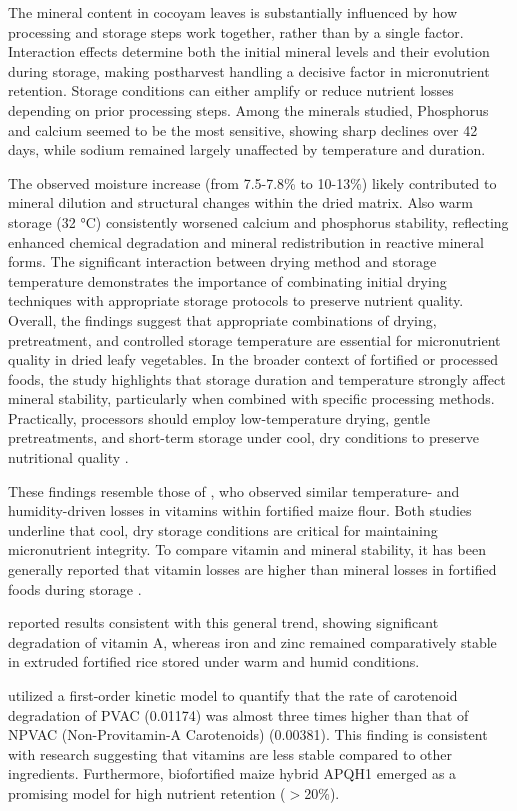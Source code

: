 The mineral content in cocoyam leaves is substantially influenced by how processing and storage steps work together, rather than by a single factor. Interaction effects determine both the initial mineral levels and their evolution during storage, making postharvest handling a decisive factor in micronutrient retention. Storage conditions can either amplify or reduce nutrient losses depending on prior processing steps. Among the minerals studied, Phosphorus and calcium seemed to be the most sensitive, showing sharp declines over 42 days, while sodium remained largely unaffected by temperature and duration. \par
The observed moisture increase (from 7.5-7.8\% to 10-13\%) likely contributed to mineral dilution and structural changes within the dried matrix. Also warm storage (32 °C) consistently worsened calcium and phosphorus stability, reflecting enhanced chemical degradation and mineral redistribution in reactive mineral forms. The significant interaction between drying method and storage temperature demonstrates the importance of combinating initial drying techniques with appropriate storage protocols to preserve nutrient quality. 
 Overall, the findings suggest that appropriate combinations of drying, pretreatment, and controlled storage temperature are essential for micronutrient quality in dried leafy vegetables. In the broader context of fortified or processed foods, the study highlights that storage duration and temperature strongly affect mineral stability, particularly when combined with specific processing methods. Practically, processors should employ low-temperature drying, gentle pretreatments, and short-term storage under cool, dry conditions to preserve nutritional quality \autocite{li5cocoyam}. \par
These findings resemble those of \citet{chepkoech}, who observed similar temperature- and humidity-driven losses in vitamins within fortified maize flour. Both studies underline that cool, dry storage conditions are critical for maintaining micronutrient integrity.
To compare vitamin and mineral stability, it has been generally reported that vitamin losses are higher than mineral losses in fortified foods during storage \autocite{chepkoech}.




\citet{saha} reported results consistent with this general trend, showing significant degradation of vitamin A, whereas iron and zinc remained comparatively stable in extruded fortified rice stored under warm and humid conditions.
\par 
\citet{dutta} utilized a first-order kinetic model to quantify that the rate of carotenoid degradation of PVAC (0.01174) was almost three times higher than that of NPVAC (Non-Provitamin-A Carotenoids) (0.00381). This finding is consistent with research suggesting that vitamins are less stable compared to other  ingredients. Furthermore, biofortified maize hybrid APQH1 emerged as a promising model for high nutrient retention ($>$20\%).


